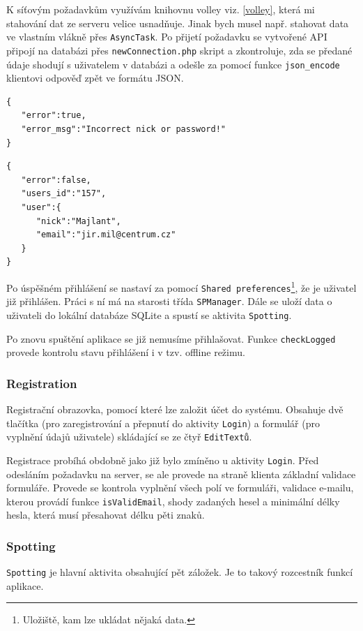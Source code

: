 \documentclass[12pt]{article}
\begin{document}
K síťovým požadavkům využívám knihovnu volley viz. \ref{volley}, která mi stahování dat ze serveru velice usnadňuje. Jinak bych musel např. stahovat data ve vlastním vlákně přes \verb+AsyncTask+. Po přijetí požadavku se vytvořené API připojí na databázi přes \verb+newConnection.php+ skript a zkontroluje, zda se předané údaje shodují s uživatelem v databázi a odešle za pomocí funkce \verb+json_encode+ klientovi odpověď zpět ve formátu JSON.
\begin{lstlisting}[title=Ukázka odpovědi s chybovou zprávou]
{
   "error":true,
   "error_msg":"Incorrect nick or password!"
}
\end{lstlisting}
\begin{lstlisting}[title=Ukázka odpovědi s úspěšným přihlášením]
{
   "error":false,
   "users_id":"157",
   "user":{
      "nick":"Majlant",
      "email":"jir.mil@centrum.cz"
   }
}
\end{lstlisting}

Po úspěšném přihlášení se nastaví za pomocí \verb+Shared preferences+\footnote[10]{Uložiště, kam lze ukládat nějaká data.}, že je uživatel již přihlášen.  Práci s ní má na starosti třída \verb+SPManager+. Dále se uloží data o uživateli do lokální databáze SQLite a spustí se aktivita \verb+Spotting+. 

Po znovu spuštění aplikace se již nemusíme přihlašovat. Funkce \verb+checkLogged+ provede kontrolu stavu přihlášení i v tzv. offline režimu.
\subsubsection{Registration}
Registrační obrazovka, pomocí které lze založit účet do systému. Obsahuje dvě tlačítka (pro zaregistrování a přepnutí do aktivity \verb+Login+) a formulář (pro vyplnění údajů uživatele) skládající se ze čtyř \verb+EditTextů+.

Registrace probíhá obdobně jako již bylo zmíněno u aktivity \verb+Login+. Před odesláním požadavku na server, se ale provede na straně klienta základní validace formuláře. Provede se kontrola vyplnění všech polí ve formuláři, validace e-mailu, kterou provádí funkce \verb+isValidEmail+, shody zadaných hesel a minimální délky hesla, která musí přesahovat délku pěti znaků.
\subsubsection{Spotting}
\verb+Spotting+ je hlavní aktivita obsahující pět záložek. Je to takový rozcestník funkcí aplikace.
\end{document}
